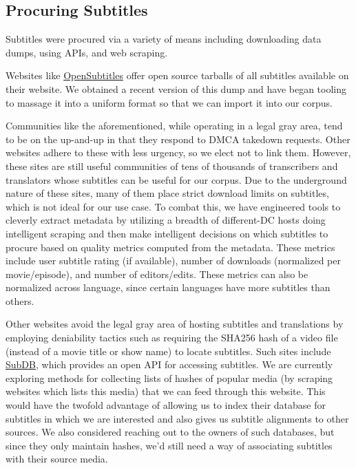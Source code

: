 \documentclass[twoside,twocolumn]{article}
\begin{document}
\subsection{Procuring Subtitles}
\label{subsec:procuring-subtitles}

Subtitles were procured via a variety of means including downloading data
dumps, using APIs, and web scraping.

Websites like \href{https://www.opensubtitles.org/}{OpenSubtitles} offer
open source tarballs of all subtitles available on their website. We obtained
a recent version of this dump and have began tooling to massage it into a
uniform format so that we can import it into our corpus.

Communities like the aforementioned, while operating in a legal gray area, tend
to be on the up-and-up in that they respond to DMCA takedown requests. Other
websites adhere to these with less urgency, so we elect not to link them.
However, these sites are still useful communities of tens of thousands of
transcribers and translators whose subtitles can be useful for our corpus. Due
to the underground nature of these sites, many of them place strict download
limits on subtitles, which is not ideal for our use case. To combat this, we
have engineered tools to cleverly extract metadata by utilizing a breadth of
different-DC hosts doing intelligent scraping and then make intelligent
decisions on which subtitles to procure based on quality metrics computed from
the metadata. These metrics include user subtitle rating (if available), number
of downloads (normalized per movie/episode), and number of editors/edits. These
metrics can also be normalized across language, since certain languages have
more subtitles than others.

Other websites avoid the legal gray area of hosting subtitles and translations
by employing deniability tactics such as requiring the SHA256 hash of a video
file (instead of a movie title or show name) to locate subtitles. Such sites
include \href{http://thesubdb.com/}{SubDB}, which provides an open API for
accessing subtitles. We are currently exploring methods for collecting lists of
hashes of popular media (by scraping websites which lists this media) that we
can feed through this website. This would have the twofold advantage of
allowing us to index their database for subtitles in which we are interested
and also gives us subtitle alignments to other sources. We also considered
reaching out to the owners of such databases, but since they only maintain
hashes, we'd still need a way of associating subtitles with their source media.
\end{document}
